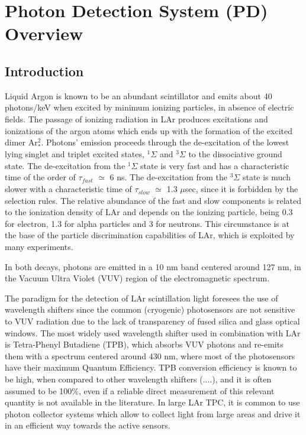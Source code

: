 \section{Photon Detection System (PD) Overview}
\label{sec:fdsp-pd-ov}

\subsection{Introduction}
\label{sec:fdsp-pd-intro}

Liquid Argon is known to be an abundant scintillator and emits about 40 
photons/keV when excited  by minimum ionizing particles, in absence of 
electric fields. The passage of ionizing radiation in LAr produces excitations 
and ionizations of the argon atoms which ends up with the formation of the 
excited dimer Ar$^2_*$. Photons' emission proceeds through the de-excitation 
of the lowest lying singlet and triplet excited states, $^{1}\Sigma$ and 
$^{3}\Sigma$ to the dissociative ground state. The de-excitation from the 
$^{1}\Sigma$ state is very fast and has a characteristic time of the order of 
$\tau_{fast}$ $\simeq$ 6 ns. The de-excitation from the $^{3}\Sigma$ state is 
much slower with a characteristic time of $\tau_{slow}$ $\simeq$ 1.3 $\mu$sec, 
since it is forbidden by the selection rules. The relative abundance of the 
fast and slow components is related to the ionization density of LAr and 
depends on the ionizing particle, being 0.3 for electron, 1.3 for alpha 
particles and 3 for neutrons. This circumstance is at the base of the  
particle discrimination capabilities of LAr, which is exploited by many 
experiments.

In both decays, photons are emitted in a 10 nm band centered around 127 nm, in 
the Vacuum Ultra Violet (VUV) region of the electromagnetic spectrum.

The paradigm for the detection of LAr scintillation light foresees the use of 
wavelength shifters since the common (cryogenic) photosensors are not 
sensitive to VUV radiation due to the lack of transparency of fused silica and 
glass optical windows. The most widely used wavelength shifter used in 
combination with LAr is Tetra-Phenyl Butadiene (TPB), which absorbs VUV photons 
and re-emits them with a spectrum centered around 430 nm, where most of the 
photosensors have their maximum Quantum Efficiency. TPB conversion efficiency 
is known to be high, when compared to other wavelength shifters (....), and 
it is often assumed to be 100\%, even if a reliable direct measurement of this 
relevant quantity is not available in the literature. 
In large LAr TPC, it is common to use photon collector systems which allow to 
collect light from large areas and drive it in an efficient way towards the 
active sensors.

